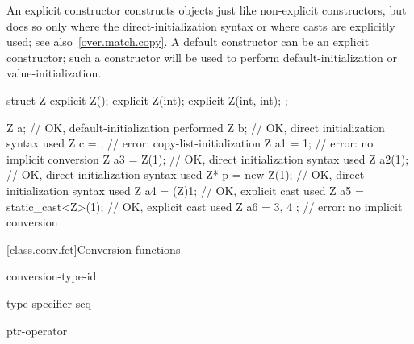 \pnum
\begin{note}
An explicit constructor constructs objects just like non-explicit
constructors, but does so only where the direct-initialization syntax
or where casts are explicitly
used; see also~\ref{over.match.copy}.
A default constructor can be an explicit constructor; such a constructor
will be used to perform default-initialization
or value-initialization.
\begin{example}
\begin{codeblock}
struct Z {
  explicit Z();
  explicit Z(int);
  explicit Z(int, int);
};

Z a;                            // OK, default-initialization performed
Z b{};                          // OK, direct initialization syntax used
Z c = {};                       // error: copy-list-initialization
Z a1 = 1;                       // error: no implicit conversion
Z a3 = Z(1);                    // OK, direct initialization syntax used
Z a2(1);                        // OK, direct initialization syntax used
Z* p = new Z(1);                // OK, direct initialization syntax used
Z a4 = (Z)1;                    // OK, explicit cast used
Z a5 = static_cast<Z>(1);       // OK, explicit cast used
Z a6 = { 3, 4 };                // error: no implicit conversion
\end{codeblock}
\end{example}
\end{note}

[class.conv.fct]{Conversion functions}%
%
%
%

\begin{bnf}
\br
     conversion-type-id
\end{bnf}

\begin{bnf}
\br
    type-specifier-seq 
\end{bnf}

\begin{bnf}
\br
    ptr-operator 
\end{bnf}

